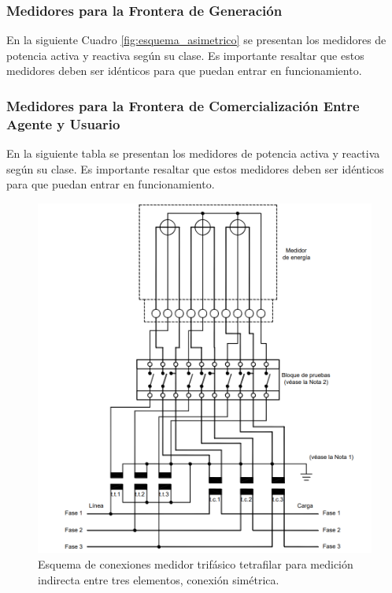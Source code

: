 \subsubsection{Medidores para la Frontera de Generación}
En la siguiente Cuadro \ref{fig:esquema_asimetrico} se presentan los medidores de potencia activa y reactiva según su clase. Es importante resaltar que estos medidores deben ser idénticos para que puedan entrar en funcionamiento.

\subsubsection{Medidores para la Frontera de Comercialización Entre Agente y Usuario}
En la siguiente tabla se presentan los medidores de potencia activa y reactiva según su clase. Es importante resaltar que estos medidores deben ser idénticos para que puedan entrar en funcionamiento.





\begin{figure}[t]
    \centering
    \includegraphics[width=\columnwidth]{figs/figura_esquema_simetrico.png}
    \caption{Esquema de conexiones medidor trifásico tetrafilar para medición indirecta entre tres elementos, conexión simétrica.}
    \label{fig:esquema_simetrico}
\end{figure}

